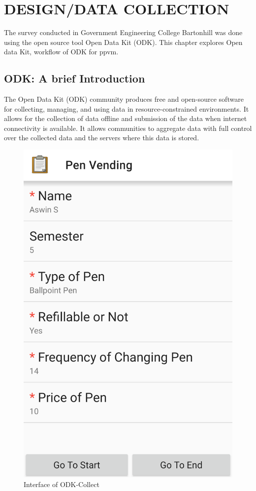 \chapter{DESIGN/DATA COLLECTION}\label{chap3}
\thispagestyle{empty}

The survey conducted in Government Engineering College Bartonhill was done using the open source tool Open Data Kit (ODK). This chapter explores Open data Kit, workflow of ODK for ppvm.  
\section{ODK: A brief Introduction}

The Open Data Kit (ODK) community produces free and open-source software for collecting, managing, and using data in resource-constrained environments. It allows for the collection of data offline and submission of the data when internet connectivity is available. It allows communities to aggregate data with full control over the collected data and the servers where this data is stored. \cite{odk}


\begin{figure}[h!]
\centering
\includegraphics[width=0.4\linewidth]{./picture-files/odk.png}
\caption[ODK-Collect]{Interface of ODK-Collect}
\label{figureone}
\end{figure}


